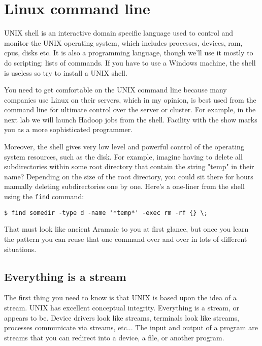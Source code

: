 \chapter{Linux command line}

\setcounter{problem}{1}

\begin{fullwidth}

UNIX shell is an interactive domain specific language used to control and monitor the UNIX operating system, which includes processes, devices, ram, cpus, disks etc.   It is also a programming language, though we'll use it mostly to do scripting: lists of commands. If you have to use a Windows machine, the shell is useless so try to install a UNIX shell.

You need to get comfortable on the UNIX command line because many companies use Linux on their servers, which in my opinion, is best used from the command line for ultimate control over the server or cluster. For example, in the next lab we will launch Hadoop jobs from the shell.  Facility with the show marks you as a more sophisticated programmer.

Moreover, the shell gives very low level and powerful control of the operating system resources, such as the disk.  For example, imagine having to delete all subdirectories within some root directory that contain the string "temp" in their name?  Depending on the size of the root directory, you could sit there for hours manually deleting subdirectories one by one. Here's a one-liner from the shell using the {\tt find} command:

\begin{lstlisting}[style=BashInputStyle]
$ find somedir -type d -name '*temp*' -exec rm -rf {} \;
\end{lstlisting}

\noindent  That must look like ancient Aramaic to you at first glance, but once you learn the pattern you can reuse that one command over and over in lots of different situations.

\section{Everything is a stream}

The first thing you need to know is that UNIX is based upon the idea of a stream. UNIX has excellent conceptual integrity. Everything is a stream, or appears to be. Device drivers look like streams, terminals look like streams, processes communicate via streams, etc... The input and output of a program are streams that you can redirect into a device, a file, or another program.


\end{fullwidth}
